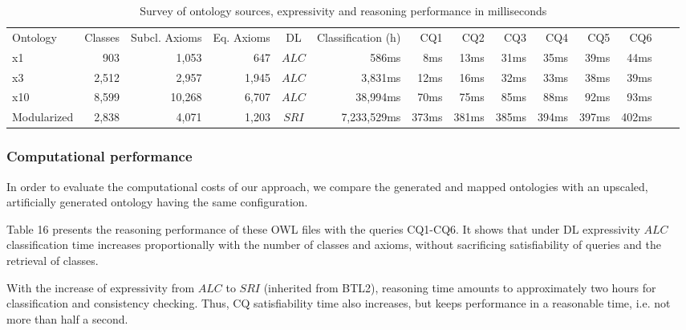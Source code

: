 %
\begin{table*}[t]
	\begin{minipage}{\textwidth}
		\label{table:Summary}
		\caption{Survey of ontology sources, expressivity and reasoning performance in milliseconds}
		\centering
		\begin{tabular}{lrrrcrrrrrrrrr}
			\hline Ontology & Classes & Subcl. Axioms & Eq. Axioms & DL & Classification (h) & CQ1 & CQ2 & CQ3 & CQ4 & CQ5 & CQ6 \\ 
			x1  &  903 & 1,053  & 647 & $ALC$  & 586ms & 8ms & 13ms & 31ms & 35ms & 39ms  & 44ms \\ 
			x3 &  2,512 	& 2,957 & 1,945 & $ALC$  & 3,831ms & 12ms & 16ms & 32ms &  33ms & 38ms  &  39ms \\ 
			x10  & 8,599	 &  10,268 & 6,707 & $ALC$ & 38,994ms &70ms & 75ms & 85ms & 88ms & 92ms & 93ms \\ 
			Modularized  & 2,838  & 4,071 & 1,203 & $SRI$ & 7,233,529ms & 373ms & 381ms & 385ms & 394ms & 397ms & 402ms \\ 
			\hline 
		\end{tabular} 
	\end{minipage}
\end{table*}


\subsubsection{Computational performance}
In order to evaluate the computational costs of our approach, we compare the generated and mapped ontologies with an upscaled, artificially generated ontology having the same configuration.

Table 16 presents the reasoning performance of these OWL files with the queries CQ1-CQ6. It shows that under DL expressivity $ALC$  classification time increases proportionally with the number of classes and axioms, without sacrificing satisfiability of queries and the retrieval of classes. 

With the increase of expressivity from $ALC$ to $SRI$ (inherited from BTL2), reasoning time amounts to approximately two hours for classification and consistency checking. Thus, CQ satisfiability time also increases, but keeps performance in a reasonable time, i.e. not more than half a second. 


%
%

